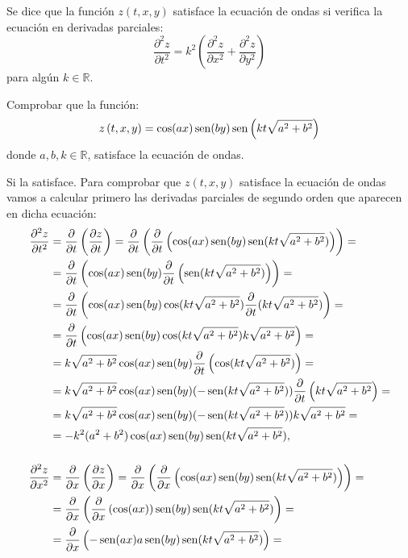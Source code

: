 {Se  dice que la función $z(t,x,y)$ satisface la ecuación de ondas si verifica la ecuación en derivadas parciales:
\[
\frac{{\partial ^2 z}} {{\partial t^2 }} = k^2 \left(
{\frac{{\partial ^2 z}} {{\partial x^2 }} + \frac{{\partial ^2 z}}
{{\partial y^2 }}} \right)
\]
para algún $k\in \mathbb{R}$.

Comprobar que la función:
\[
z\left( {t,x,y} \right) = \cos (ax)\operatorname{sen}(by)\operatorname{sen}\left( {kt\sqrt
{a^2 + b^2 } } \right)
\]
donde $a,b,k \in \mathbb{R}$, satisface la ecuación de ondas.
}
{Si la satisface.
}
{Para comprobar que $z(t,x,y)$ satisface la ecuación de ondas vamos a calcular primero las derivadas parciales de segundo orden que aparecen en dicha ecuación:
\begin{align*}
\frac{\partial^2 z}{\partial t^2} &=
\frac{\partial}{\partial t}\left(\frac{\partial z}{\partial t}\right) = 
\frac{\partial}{\partial t}\left(\frac{\partial}{\partial t}\left(\cos(ax)\sen(by)\sen(kt\sqrt{a^2+b^2})\right)\right)= \\
&= \frac{\partial}{\partial t}\left(\cos(ax)\sen(by)\frac{\partial}{\partial t}\left(\sen(kt\sqrt{a^2+b^2})\right)\right)=\\ 
&= \frac{\partial}{\partial t}\left(\cos(ax)\sen(by)\cos(kt\sqrt{a^2+b^2})\frac{\partial}{\partial t}(kt\sqrt{a^2+b^2})\right)=\\
&= \frac{\partial}{\partial t}\left(\cos(ax)\sen(by)\cos(kt\sqrt{a^2+b^2}) k\sqrt{a^2+b^2}\right)=\\
&= k\sqrt{a^2+b^2}\cos(ax)\sen(by)\frac{\partial}{\partial t}\left(\cos(kt\sqrt{a^2+b^2}) \right)=\\
&= k\sqrt{a^2+b^2}\cos(ax)\sen(by)(-\sen(kt\sqrt{a^2+b^2}))\frac{\partial}{\partial t}\left(kt\sqrt{a^2+b^2}\right)=\\ 
&=k\sqrt{a^2+b^2}\cos(ax)\sen(by)(-\sen(kt\sqrt{a^2+b^2}))k\sqrt{a^2+b^2}=\\
&= -k^2(a^2+b^2)\cos(ax)\sen(by)\sen(kt\sqrt{a^2+b^2}),\\[.5cm]
\frac{\partial^2 z}{\partial x^2} &=
\frac{\partial}{\partial x}\left(\frac{\partial z}{\partial x}\right)  
= \frac{\partial}{\partial x}\left(\frac{\partial}{\partial x}\left(\cos(ax)\sen(by)\sen(kt\sqrt{a^2+b^2})\right)\right)= \\
&= \frac{\partial}{\partial x}\left(\frac{\partial}{\partial x}\left(\cos(ax)\right)\sen(by)\sen(kt\sqrt{a^2+b^2})\right)=\\ 
&= \frac{\partial}{\partial x}\left(-\sen(ax)a\sen(by)\sen(kt\sqrt{a^2+b^2})\right)=\\

\end{align*}}
